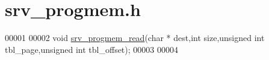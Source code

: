 \hypertarget{a00063_source}{\section{srv\+\_\+progmem.\+h}
\label{a00063_source}
}

\begin{DoxyCode}
00001 
00002 \textcolor{keywordtype}{void}  \hyperlink{a00063_a14313634cfdab0876ff39edc1a401bda}{srv\_progmem\_read}(\textcolor{keywordtype}{char} * dest,\textcolor{keywordtype}{int} size,\textcolor{keywordtype}{unsigned} \textcolor{keywordtype}{int} tbl\_page,\textcolor{keywordtype}{unsigned} \textcolor{keywordtype}{int} tbl\_offset);
00003 
00004 
\end{DoxyCode}
